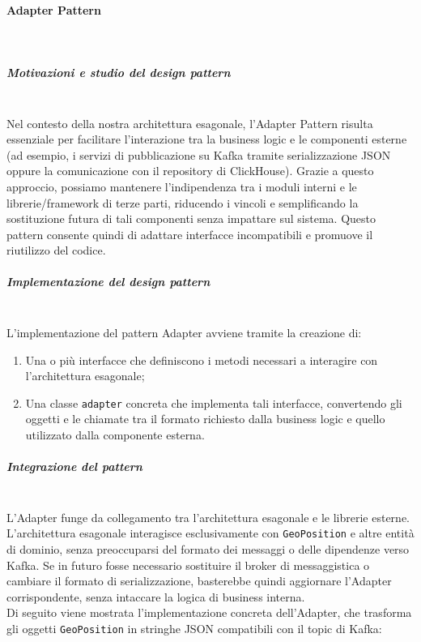 \documentclass[10pt]{article}
\newcommand{\myparagraph}[1]{\paragraph{#1}\mbox{}\\}
\newcommand{\mysubparagraph}[1]{\subparagraph{#1}\mbox{}\\}
\begin{document}
\myparagraph{Adapter Pattern}
\mysubparagraph{Motivazioni e studio del design pattern}
Nel contesto della nostra architettura esagonale, l’Adapter Pattern risulta essenziale per facilitare l’interazione tra la business logic e le componenti esterne (ad esempio, i servizi di pubblicazione su Kafka tramite serializzazione JSON oppure la comunicazione con il repository di ClickHouse). Grazie a questo approccio, possiamo mantenere l’indipendenza tra i moduli interni e le librerie/framework di terze parti, riducendo i vincoli e semplificando la sostituzione futura di tali componenti senza impattare sul sistema. Questo pattern consente quindi di adattare interfacce incompatibili e promuove il riutilizzo del codice.

\mysubparagraph{Implementazione del design pattern}
L’implementazione del pattern Adapter avviene tramite la creazione di:
\begin{enumerate}
    \item Una o più interfacce che definiscono i metodi necessari a interagire con l’architettura esagonale;
    \item Una classe \texttt{adapter} concreta che implementa tali interfacce, convertendo gli oggetti e le chiamate tra il formato richiesto dalla business logic e quello utilizzato dalla componente esterna.
\end{enumerate}

\mysubparagraph{Integrazione del pattern}
L’Adapter funge da collegamento tra l’architettura esagonale e le librerie esterne. L’architettura esagonale interagisce esclusivamente con \texttt{GeoPosition} e altre entità di dominio, senza preoccuparsi del formato dei messaggi o delle dipendenze verso Kafka. Se in futuro fosse necessario sostituire il broker di messaggistica o cambiare il formato di serializzazione, basterebbe quindi aggiornare l’Adapter corrispondente, senza intaccare la logica di business interna.\\
Di seguito viene mostrata l’implementazione concreta dell’Adapter, che trasforma gli oggetti \texttt{GeoPosition} in stringhe JSON compatibili con il topic di Kafka:
\end{document}
